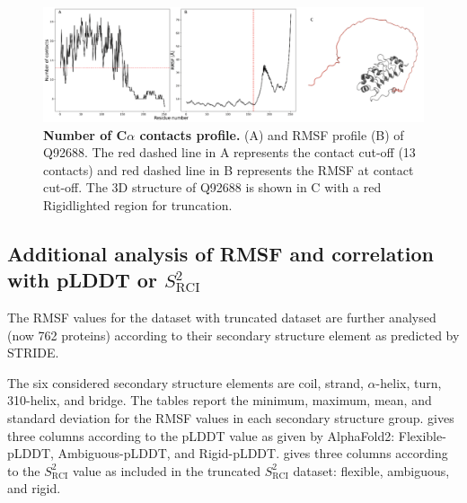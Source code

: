 \begin{figure}[H]
    \centering
    \includegraphics[width=\linewidth]{pLDDT//plddt_figures//supplementary_bhawna/supfig15.pdf}
    \caption{\textbf{Number of C$\alpha$ contacts profile.} (A) and RMSF profile (B) of Q92688. The red dashed line in A represents the contact cut-off (13 contacts) and red dashed line in B represents the RMSF at contact cut-off. The 3D structure of Q92688 is shown in C with a red Rigidlighted region for truncation.}
    \label{fig:plddt_sup:sup15}
\end{figure}

\subsection*{Additional analysis of RMSF and correlation with pLDDT or $S_{\text{RCI}}^{2}$}

The RMSF values for the dataset with truncated dataset are further analysed (now 762 proteins) according to their secondary structure element as predicted by STRIDE.

The six considered secondary structure elements are coil, strand, $\alpha$-helix, turn, 310-helix, and bridge. The tables report the minimum, maximum, mean, and standard deviation for the RMSF values in each secondary structure group.  gives three columns according to the pLDDT value as given by AlphaFold2: Flexible-pLDDT, Ambiguous-pLDDT, and Rigid-pLDDT.  gives three columns according to the $S_{\text{RCI}}^{2}$ value as included in the truncated $S_{\text{RCI}}^{2}$ dataset: flexible, ambiguous, and rigid.

